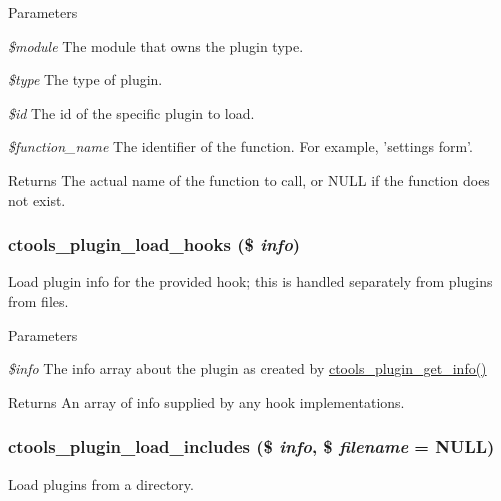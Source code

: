 \begin{DoxyParams}{Parameters}
\item[{\em \$module}]The module that owns the plugin type. \item[{\em \$type}]The type of plugin. \item[{\em \$id}]The id of the specific plugin to load. \item[{\em \$function\_\-name}]The identifier of the function. For example, 'settings form'.\end{DoxyParams}
\begin{DoxyReturn}{Returns}
The actual name of the function to call, or NULL if the function does not exist. 
\end{DoxyReturn}
\hypertarget{ctools_2includes_2plugins_8inc_a4f9d205d17ac047d08346c891254b57d}{
\subsubsection[{ctools\_\-plugin\_\-load\_\-hooks}]{\setlength{\rightskip}{0pt plus 5cm}ctools\_\-plugin\_\-load\_\-hooks (\$ {\em info})}}
\label{ctools_2includes_2plugins_8inc_a4f9d205d17ac047d08346c891254b57d}
Load plugin info for the provided hook; this is handled separately from plugins from files.


\begin{DoxyParams}{Parameters}
\item[{\em \$info}]The info array about the plugin as created by \hyperlink{ctools_2includes_2plugins_8inc_addf3f6a3107a10cf5fb701420a9f8dcb}{ctools\_\-plugin\_\-get\_\-info()}\end{DoxyParams}
\begin{DoxyReturn}{Returns}
An array of info supplied by any hook implementations. 
\end{DoxyReturn}
\hypertarget{ctools_2includes_2plugins_8inc_a0aef65ab6f4cc9910d50e558ae31893a}{
\subsubsection[{ctools\_\-plugin\_\-load\_\-includes}]{\setlength{\rightskip}{0pt plus 5cm}ctools\_\-plugin\_\-load\_\-includes (\$ {\em info}, \/  \$ {\em filename} = {\ttfamily NULL})}}
\label{ctools_2includes_2plugins_8inc_a0aef65ab6f4cc9910d50e558ae31893a}
Load plugins from a directory.


